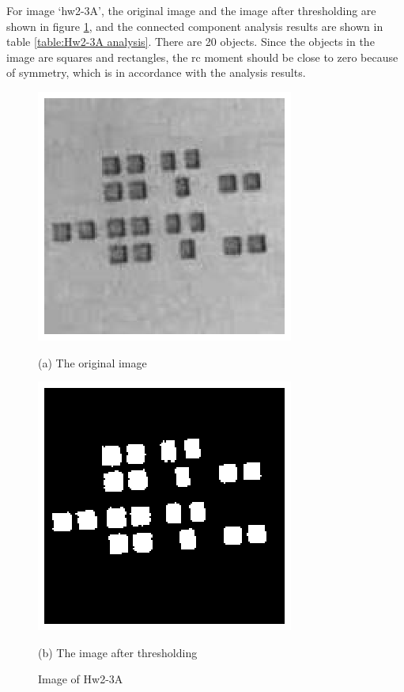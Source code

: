 \documentclass[a4paper]{article}
\begin{document}
For image `hw2-3A', the original image and the image after thresholding are shown in figure \ref{figure:Hw2-3A image}, and the connected component analysis results are shown in table \ref{table:Hw2-3A analysis}. There are 20 objects. Since the objects in the image are squares and rectangles, the rc moment should be close to zero because of symmetry, which is in accordance with the analysis results.   
\begin{figure}[h]
	\begin{minipage}[h]{0.5\linewidth}
		\centering
		\includegraphics{program/1/figure/Hw2-3A.eps}
		\caption*{(a) The original image}
		\label{subfigure:Hw2-3A-original}
	\end{minipage}
	\begin{minipage}[h]{0.5\linewidth}
		\centering
		\includegraphics{program/1/figure/Hw2-3A-threshold.eps}
		\caption*{(b) The image after thresholding}
		\label{subfigure:Hw2-3A-threshold}
	\end{minipage}
	\caption{Image of Hw2-3A}\label{figure:Hw2-3A image}
\end{figure}
\end{document}
